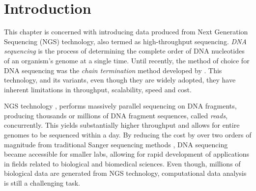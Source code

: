 \section{Introduction} \label{data-intro-sect}
This chapter is concerned with introducing data produced from Next Generation Sequencing (NGS) technology, also termed as high-throughput sequencing. \emph{DNA sequencing} is the process of determining the complete order of DNA nucleotides of an organism's genome at a single time. Until recently, the method of choice for DNA sequencing was the \emph{chain termination} method developed by \citet{Sanger1977}. This technology, and its variants, even though they are widely adopted, they have inherent limitations in throughput, scalability, speed and cost. 

NGS technology \citep{Shendure2008, Mardis2008}, performs massively parallel sequencing on DNA fragments, producing thousands or millions of DNA fragment sequences, called \emph{reads}, concurrently. This yields substantially higher throughput and allows for entire genomes to be sequenced within a day. By reducing the cost by over two orders of magnitude from traditional Sanger sequencing methods \citep{Shendure2008}, DNA sequencing became accessible for smaller labs, allowing for rapid development of applications in fields related to biological and biomedical sciences. Even though, millions of biological data are generated from NGS technology, computational data analysis is still a challenging task.